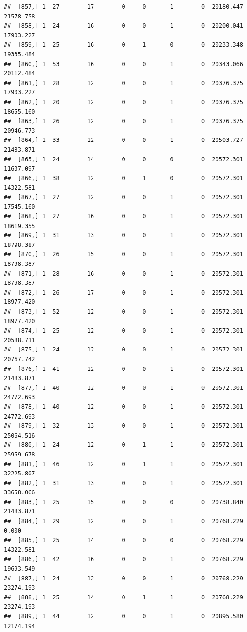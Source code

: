 \documentclass[
]{article}
\begin{document}
\begin{verbatim}
##  [857,] 1  27        17        0     0       1        0  20180.447  21578.758
##  [858,] 1  24        16        0     0       1        0  20200.041  17903.227
##  [859,] 1  25        16        0     1       0        0  20233.348  19335.484
##  [860,] 1  53        16        0     0       1        0  20343.066  20112.484
##  [861,] 1  28        12        0     0       1        0  20376.375  17903.227
##  [862,] 1  20        12        0     0       1        0  20376.375  18655.160
##  [863,] 1  26        12        0     0       1        0  20376.375  20946.773
##  [864,] 1  33        12        0     0       1        0  20503.727  21483.871
##  [865,] 1  24        14        0     0       0        0  20572.301  11637.097
##  [866,] 1  38        12        0     1       0        0  20572.301  14322.581
##  [867,] 1  27        12        0     0       1        0  20572.301  17545.160
##  [868,] 1  27        16        0     0       1        0  20572.301  18619.355
##  [869,] 1  31        13        0     0       1        0  20572.301  18798.387
##  [870,] 1  26        15        0     0       1        0  20572.301  18798.387
##  [871,] 1  28        16        0     0       1        0  20572.301  18798.387
##  [872,] 1  26        17        0     0       1        0  20572.301  18977.420
##  [873,] 1  52        12        0     0       1        0  20572.301  18977.420
##  [874,] 1  25        12        0     0       1        0  20572.301  20588.711
##  [875,] 1  24        12        0     0       1        0  20572.301  20767.742
##  [876,] 1  41        12        0     0       1        0  20572.301  21483.871
##  [877,] 1  40        12        0     0       1        0  20572.301  24772.693
##  [878,] 1  40        12        0     0       1        0  20572.301  24772.693
##  [879,] 1  32        13        0     0       1        0  20572.301  25064.516
##  [880,] 1  24        12        0     1       1        0  20572.301  25959.678
##  [881,] 1  46        12        0     1       1        0  20572.301  32225.807
##  [882,] 1  31        13        0     0       1        0  20572.301  33658.066
##  [883,] 1  25        15        0     0       0        0  20738.840  21483.871
##  [884,] 1  29        12        0     0       1        0  20768.229      0.000
##  [885,] 1  25        14        0     0       0        0  20768.229  14322.581
##  [886,] 1  42        16        0     0       1        0  20768.229  19693.549
##  [887,] 1  24        12        0     0       1        0  20768.229  23274.193
##  [888,] 1  25        14        0     1       1        0  20768.229  23274.193
##  [889,] 1  44        12        0     0       1        0  20895.580  12174.194

\end{verbatim}
\end{document}
